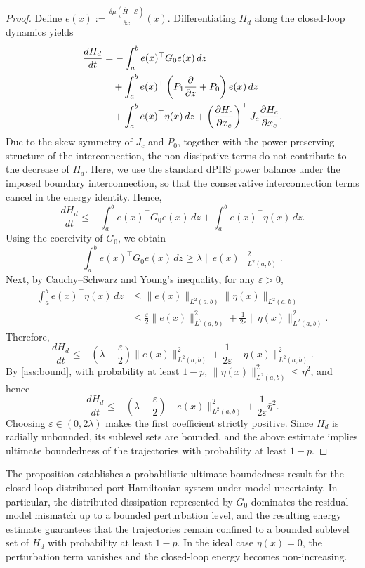 \documentclass[letterpaper, 10 pt, conference]{ieeeconf}  %
\newcounter{part} %
\begin{document}
\begin{proof}
Define $\displaystyle{e(x):=\frac{\delta \mu(\hat{H}\mid\mathcal{E})}{\delta x}(x)}$. Differentiating \(H_d\) along the closed-loop dynamics yields
\begin{align}
    \frac{dH_d}{dt} &= - \int_a^b e(x)^\top G_0 e(x) \, dz \notag\\
    &\quad + \int_a^b e(x)^\top \left(P_1 \frac{\partial}{\partial z} + P_0 \right)e(x) \, dz \notag\\
    &\quad + \int_a^b e(x)^\top \eta(x) \, dz  + \left(\frac{\partial H_c}{\partial x_c}\right)^\top J_c \frac{\partial H_c}{\partial x_c}. \label{for:proof}
\end{align}
Due to the skew-symmetry of \(J_c\) and \(P_0\), together with the power-preserving structure of the interconnection, the non-dissipative terms do not contribute to the decrease of \(H_d\). Here, we use the standard dPHS power balance under the imposed boundary interconnection, so that the conservative interconnection terms cancel in the energy identity. Hence,
\[
\frac{dH_d}{dt} \le - \int_a^b e(x)^\top G_0 e(x)\,dz + \int_a^b e(x)^\top \eta(x)\,dz.
\]
Using the coercivity of \(G_0\), we obtain
\[
\int_a^b e(x)^\top G_0 e(x)\,dz \ge \lambda \|e(x)\|_{L^2(a,b)}^2.
\]
Next, by Cauchy--Schwarz and Young's inequality, for any \(\varepsilon>0\),
\begin{align*}
\int_a^b e(x)^\top \eta(x)\,dz &\le \|e(x)\|_{L^2(a,b)}\|\eta(x)\|_{L^2(a,b)}\\
&\le \frac{\varepsilon}{2}\|e(x)\|_{L^2(a,b)}^2 + \frac{1}{2\varepsilon}\|\eta(x)\|_{L^2(a,b)}^2.
\end{align*}
Therefore,
\[
\frac{dH_d}{dt}
\le -\left(\lambda-\frac{\varepsilon}{2}\right)\|e(x)\|_{L^2(a,b)}^2
+ \frac{1}{2\varepsilon}\|\eta(x)\|_{L^2(a,b)}^2.
\]
By \cref{ass:bound}, with probability at least \(1-p\), $\|\eta(x)\|_{L^2(a,b)}^2 \le \bar{\eta}^2$,
and hence
\[
\frac{dH_d}{dt}
\le -\left(\lambda-\frac{\varepsilon}{2}\right)\|e(x)\|_{L^2(a,b)}^2
+ \frac{1}{2\varepsilon}\bar{\eta}^2.
\]
Choosing \(\varepsilon\in(0,2\lambda)\) makes the first coefficient strictly positive. Since \(H_d\) is radially unbounded, its sublevel sets are bounded, and the above estimate implies ultimate boundedness of the trajectories with probability at least \(1-p\).
\end{proof}

The proposition establishes a probabilistic ultimate boundedness result for the closed-loop distributed port-Hamiltonian system under model uncertainty. In particular, the distributed dissipation represented by \(G_0\) dominates the residual model mismatch up to a bounded perturbation level, and the resulting energy estimate guarantees that the trajectories remain confined to a bounded sublevel set of \(H_d\) with probability at least \(1-p\). In the ideal case \(\eta(x)=0\), the perturbation term vanishes and the closed-loop energy becomes non-increasing.
\end{document}
